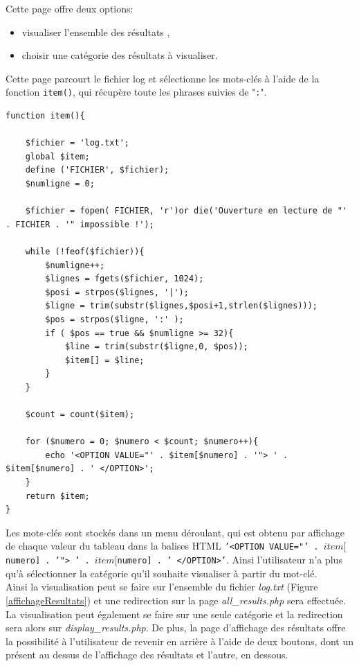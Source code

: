 Cette page offre deux options:
\begin{itemize}
\item visualiser l'ensemble des résultats ,
\item choisir une catégorie des résultats à visualiser.
\end{itemize}

Cette page parcourt le fichier log et sélectionne les mots-clés à l'aide de la fonction \texttt{item()}, qui récupère toute les phrases suivies de "\texttt{:}".

\begin{DDbox}{\linewidth}
\begin{lstlisting}
function item(){
					
	$fichier = 'log.txt';
	global $item;
	define ('FICHIER', $fichier);
	$numligne = 0;

	$fichier = fopen( FICHIER, 'r')or die('Ouverture en lecture de "' . FICHIER . '" impossible !');
					
	while (!feof($fichier)){
		$numligne++;
		$lignes = fgets($fichier, 1024);
		$posi = strpos($lignes, '|'); 
		$ligne = trim(substr($lignes,$posi+1,strlen($lignes))); 
		$pos = strpos($ligne, ':' );
		if ( $pos == true && $numligne >= 32){
			$line = trim(substr($ligne,0, $pos)); 
			$item[] = $line;
		}
	}
					
	$count = count($item);
					
	for ($numero = 0; $numero < $count; $numero++){
		echo '<OPTION VALUE="' . $item[$numero] . '"> ' . $item[$numero] . ' </OPTION>'; 
	}
	return $item;
}
\end{lstlisting}
\end{DDbox}

Les mots-clés sont stockés dans un menu déroulant, qui est obtenu par affichage de chaque valeur du tableau dans la balises HTML \texttt{'<OPTION VALUE="' . $item[$numero] . '"> ' . $item[$numero] . ' </OPTION>'}. Ainsi l'utilisateur n'a plus qu'à sélectionner la catégorie qu'il souhaite visualiser à partir du mot-clé. \\

Ainsi la visualisation peut se faire sur l'ensemble du fichier \emph{log.txt} (Figure \ref{affichageResultats}) et une redirection sur la page  \emph{all\_results.php} sera effectuée. La visualisation peut également se faire sur une seule catégorie et la redirection sera alors sur \emph{display\_results.php}. De plus, la page d'affichage des résultats offre la possibilité à l'utilisateur de revenir en arrière à l'aide de deux boutons, dont un présent au dessus de l'affichage des résultats et l'autre, en dessous.\\

